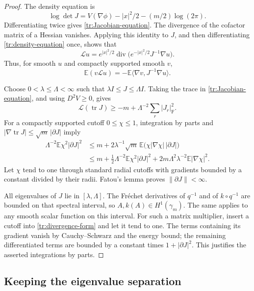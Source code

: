 \documentclass[11pt]{article}
\theoremstyle{definition}
\theoremstyle{remark}
\numberwithin{equation}{section}
\begin{document}
\begin{proof}
The density equation is
\begin{equation}\label{tr:density-equation}
 \log\det J=V(\nabla\phi)-|x|^2/2-(m/2)\log(2\pi).
\end{equation}
Differentiating twice gives \eqref{tr:Jacobian-equation}.  The divergence
of the cofactor matrix of a Hessian vanishes.  Applying this identity
to $J$, and then differentiating \eqref{tr:density-equation} once,
shows that
\[
 \mathcal L u=e^{|x|^2/2}\operatorname{div}
       \bigl(e^{-|x|^2/2}J^{-1}\nabla u\bigr).
\]
Thus, for smooth $u$ and compactly supported smooth $v$,
\begin{equation}\label{tr:divergence-form}
 \mathbb E(v\mathcal Lu)
 =-\mathbb E\langle\nabla v,J^{-1}\nabla u\rangle.
\end{equation}

Choose $0<\lambda\le\Lambda<\infty$ such that
$\lambda I\le J\le\Lambda I$.  Taking the trace in
\eqref{tr:Jacobian-equation}, and using $D^2V\ge0$, gives
\[
 \mathcal L(\operatorname{tr}J)
 \ge-m+\Lambda^{-2}\sum_r|J_r|_{\mathrm F}^2.
\]
For a compactly supported cutoff $0\le\chi\le1$, integration by parts
and $|\nabla\operatorname{tr}J|\le\sqrt m\,|\partial J|$ imply
\begin{align*}
 \Lambda^{-2}\mathbb E\chi^2|\partial J|^2
 &\le m+2\lambda^{-1}\sqrt m\,
             \mathbb E\bigl(\chi|\nabla\chi|\,|\partial J|\bigr)\\
 &\le m+\tfrac12\Lambda^{-2}\mathbb E\chi^2|\partial J|^2
       +2m\Lambda^2\lambda^{-2}\mathbb E|\nabla\chi|^2.
\end{align*}
Let $\chi$ tend to one through standard radial cutoffs with gradients
bounded by a constant divided by their radii.  Fatou's lemma proves
$\|\partial J\|<\infty$.

All eigenvalues of $J$ lie in $[\lambda,\Lambda]$.  The Fr\'echet
derivatives of $q^{-1}$ and of $k\circ q^{-1}$ are bounded on that
spectral interval, so $A,k(A)\in H^1(\gamma_m)$.  The same applies to
any smooth scalar function on this interval.  For such a matrix
multiplier, insert a cutoff into \eqref{tr:divergence-form} and let it
tend to one.  The terms containing its gradient vanish by
Cauchy--Schwarz and the energy bound; the remaining differentiated
terms are bounded by a constant times $1+|\partial J|^2$.
This justifies the asserted integrations by parts.
\end{proof}

\subsection{Keeping the eigenvalue separation}
\end{document}
